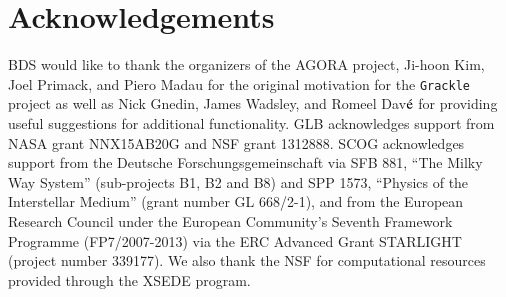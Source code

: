 \section*{Acknowledgements}

BDS would like to thank the organizers of the AGORA project, Ji-hoon
Kim, Joel Primack, and Piero Madau for the original motivation for the
\texttt{Grackle} project as well as Nick Gnedin, James Wadsley, and
Romeel Dav$\acute{\rm e}$ for providing useful suggestions for
additional functionality.  GLB acknowledges support from
NASA grant NNX15AB20G and NSF grant 1312888. SCOG acknowledges support
from the Deutsche Forschungsgemeinschaft via SFB 881, ``The Milky Way System'' 
(sub-projects B1, B2 and B8) and SPP 1573, ``Physics of the Interstellar Medium'' 
(grant number GL 668/2-1), and from the European Research Council under the 
European Community's Seventh Framework Programme (FP7/2007-2013) via the ERC 
Advanced Grant STARLIGHT (project number 339177). We also thank the NSF
for computational resources provided through the XSEDE program.
